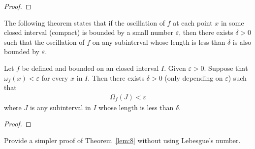 \documentclass[thmcnt=section, 12pt]{my-elegantbook}
\begin{document}
\begin{proof}
\end{proof}


\begin{theorem} \label{thm:88}
\end{theorem}


The following theorem states that if the oscillation of $f$
at each point $x$ in some closed interval (compact) is bounded by
a small number $\varepsilon$,
then there exists $\delta > 0$ such that the oscillation of $f$
on any subinterval whose length is less than $\delta$ is also
bounded by $\varepsilon$.

\begin{lemma} \label{lem:8}
    Let $f$ be defined and bounded on an closed interval $I$.
    Given $\varepsilon > 0$.
    Suppose that $\omega_f(x) < \varepsilon$ for every $x$
    in $I$.
    Then there exists $\delta > 0$ (only depending on $\varepsilon$)
    such that
    \begin{align*}
        \Omega_f(J) < \varepsilon
    \end{align*}
    where $J$ is any subinterval in $I$ whose length is less than $\delta$.
\end{lemma}

\begin{proof}
\end{proof}

\begin{exercise} \label{ex:10}
    Provide a simpler proof of Theorem~\ref{lem:8}
    without using Lebesgue's number.
\end{exercise}
\end{document}
